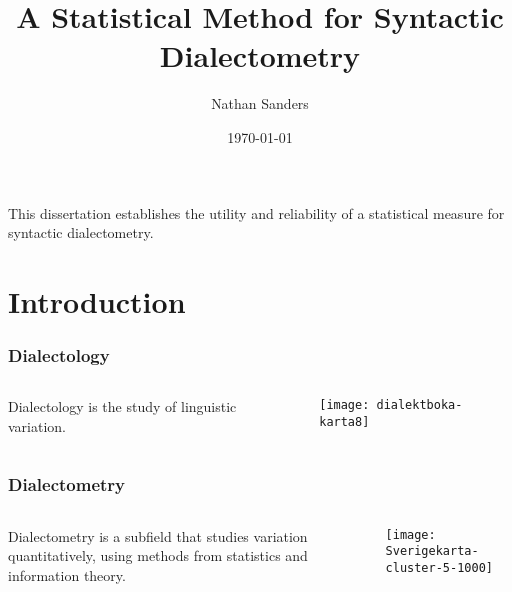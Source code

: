 \documentclass{beamer}
\title{A Statistical Method for Syntactic Dialectometry}
\author{Nathan Sanders}
\date{\today}
\begin{document}
\frame{\titlepage}

\section[Outline]{}
\frame{\tableofcontents}
\begin{frame}
  This dissertation establishes the utility and reliability of a
  statistical measure for syntactic dialectometry.
\end{frame}
\section{Introduction}
\begin{frame}
  \frametitle{Dialectology}
\begin{columns}
  \begin{definition}
    Dialectology is the study of linguistic variation.
  \end{definition}
  \texttt{[image: dialektboka-karta8]}
\end{columns}
\end{frame}
\begin{frame}
  \frametitle{Dialectometry}
\begin{columns}
 \begin{definition}
    Dialectometry is a subfield that studies variation quantitatively,
    using methods from statistics and information theory.
 \end{definition}
\texttt{[image: Sverigekarta-cluster-5-1000]}
\end{columns}
\end{frame}
\end{document}
